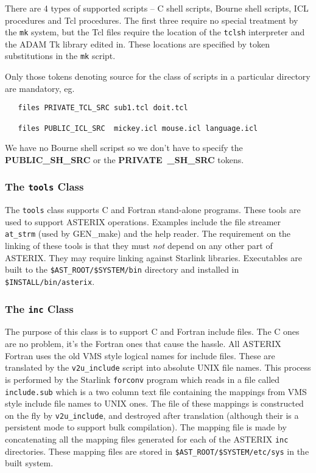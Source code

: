 There are 4 types of supported scripts -- C shell scripts, Bourne shell
scripts, ICL procedures and Tcl procedures. The first three require no
special treatment by the \verb+mk+ system, but the Tcl files require
the location of the \verb+tclsh+ interpreter and the ADAM Tk 
library edited in. These locations are specified by token substitutions
in the \verb+mk+ script.

Only those tokens denoting source for the class of scripts in a particular
directory are mandatory, eg.
\begin{verbatim}
   files PRIVATE_TCL_SRC sub1.tcl doit.tcl
   
   files PUBLIC_ICL_SRC  mickey.icl mouse.icl language.icl
\end{verbatim}
We have no Bourne shell scripst so we don't have to specify the
{\bf PUBLIC\_SH\_SRC} or the {\bf PRIVATE~\_SH\_SRC} tokens.

\subsubsection{The {\tt tools} Class}

The {\tt tools} class supports C and Fortran stand-alone programs. These
tools are used to support ASTERIX operations. Examples include the file
streamer \verb+at_strm+ (used by GEN\_make) and the help reader. The
requirement on the linking of these tools is that they must {\em not}
depend on any other part of ASTERIX. They may require linking against
Starlink libraries. Executables are built to the \verb+$AST_ROOT/$SYSTEM/bin+
directory and installed in \verb+$INSTALL/bin/asterix+.

\subsubsection{The {\tt inc} Class}

The purpose of this class is to support C and Fortran include files.
The C ones are no problem, it's the Fortran ones that cause the hassle.
All ASTERIX Fortran uses the old VMS style logical names for include
files. These are translated by the \verb+v2u_include+ script into
absolute UNIX file names. This process is performed by the Starlink
\verb+forconv+ program which reads in a file called \verb+include.sub+
which is a two column text file containing the mappings from VMS style
include file names to UNIX ones. The file of these mappings is constructed
on the fly by \verb+v2u_include+, and destroyed after translation (although 
their is a persistent mode to support bulk compilation). The mapping
file is made by concatenating all the mapping files generated for each
of the ASTERIX \verb+inc+ directories. These mapping files are stored
in \verb+$AST_ROOT/$SYSTEM/etc/sys+ in the built system.

